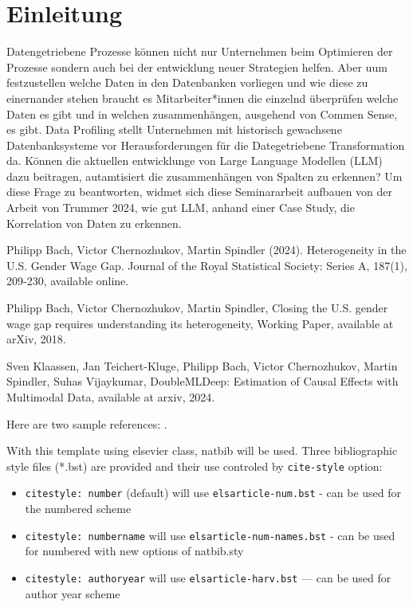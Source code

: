 \documentclass[
  authoryear,
  preprint]{elsarticle}
\providecommand{\tightlist}{%
  \setlength{\itemsep}{0pt}\setlength{\parskip}{0pt}}\usepackage{longtable,booktabs,array}
\begin{document}
\section{Einleitung}\label{einleitung}

Datengetriebene Prozesse können nicht nur Unternehmen beim Optimieren
der Prozesse sondern auch bei der entwicklung neuer Strategien helfen.
Aber uum festzustellen welche Daten in den Datenbanken vorliegen und wie
diese zu einernander stehen braucht es Mitarbeiter*innen die einzelnd
überprüfen welche Daten es gibt und in welchen zusammenhängen, ausgehend
von Commen Sense, es gibt. Data Profiling stellt Unternehmen mit
historisch gewachsene Datenbanksysteme vor Herausforderungen für die
Dategetriebene Transformation da. Können die aktuellen entwicklunge von
Large Language Modellen (LLM) dazu beitragen, autamtisiert die
zusammenhängen von Spalten zu erkennen? Um diese Frage zu beantworten,
widmet sich diese Seminararbeit aufbauen von der Arbeit von Trummer
2024, wie gut LLM, anhand einer Case Study, die Korrelation von Daten zu
erkennen.

Philipp Bach, Victor Chernozhukov, Martin Spindler (2024). Heterogeneity
in the U.S. Gender Wage Gap. Journal of the Royal Statistical Society:
Series A, 187(1), 209-230, available online.

Philipp Bach, Victor Chernozhukov, Martin Spindler, Closing the U.S.
gender wage gap requires understanding its heterogeneity, Working Paper,
available at arXiv, 2018.

Sven Klaassen, Jan Teichert-Kluge, Philipp Bach, Victor Chernozhukov,
Martin Spindler, Suhas Vijaykumar, DoubleMLDeep: Estimation of Causal
Effects with Multimodal Data, available at arxiv, 2024.

\citet{RN5574}

Here are two sample references: \citet{Feynman1963118}
\citet{Dirac1953888}.

With this template using elsevier class, natbib will be used. Three
bibliographic style ﬁles (*.bst) are provided and their use controled by
\texttt{cite-style} option:

\begin{itemize}
\tightlist
\item
  \texttt{citestyle:\ number} (default) will use
  \texttt{elsarticle-num.bst} - can be used for the numbered scheme
\item
  \texttt{citestyle:\ numbername} will use
  \texttt{elsarticle-num-names.bst} - can be used for numbered with new
  options of natbib.sty
\item
  \texttt{citestyle:\ authoryear} will use \texttt{elsarticle-harv.bst}
  --- can be used for author year scheme
\end{itemize}
\end{document}
